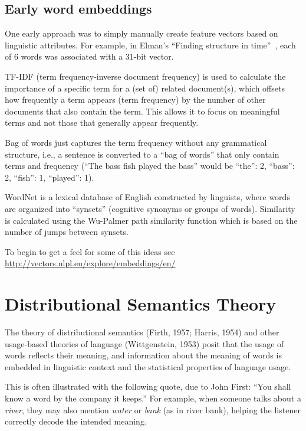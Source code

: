 \subsection{Early word embeddings}

One early approach was to simply manually create feature vectors based on linguistic attributes.  For example, in Elman's ``Finding structure in time''~\cite{elman1990finding}, each of 6 words was associated with a 31-bit vector. 

TF-IDF (term frequency-inverse document frequency) is used to calculate the importance of a specific term for a (set of) related document(s), which offsets how frequently a term appears (term frequency) by the number of other documents that also contain the term. This allows it to focus on meaningful terms and not those that generally appear frequently. 

Bag of words just captures the term frequency without any grammatical structure, i.e., a sentence is converted to a ``bag of words'' that only contain terms and frequency (``The bass fish played the bass'' would be {``the'': 2, ``bass'': 2, ``fish'': 1, ``played'': 1}).

WordNet is a lexical database of English constructed by linguists, where words are organized into ``synsets'' (cognitive synonyms or groups of words). Similarity is calculated using the Wu-Palmer path similarity function which is based on the number of jumps between synsets.

To begin to get a feel for some of this ideas see \url{http://vectors.nlpl.eu/explore/embeddings/en/}
 
\section{Distributional Semantics Theory}


The theory of distributional semantics (Firth, 1957; Harris, 1954) and other usage-based theories of language (Wittgenstein, 1953) posit that the usage of words reflects their meaning, and information about the meaning of words is embedded in linguistic context and the statistical properties of language usage.

This is often illustrated with the following quote, due to John First: ``You shall know a word by the company it keeps.'' For example, when someone talks about a \textit{river}, they may also mention \textit{water} or \textit{bank} (as in river bank), helping the listener correctly decode the intended meaning.

